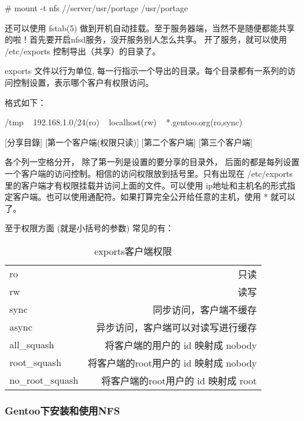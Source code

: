\begin{code}
\# mount -t nfs //server/usr/portage	/usr/portage
\end{code}

还可以使用 fstab(5) 做到开机自动挂载。至于服务器端，当然不是随便都能共享的啦！首先要开启nfsd服务，没开服务别人怎么共享。
开了服务，就可以使用 /etc/exports 控制导出（共享）的目录了。

exports 文件以行为单位, 每一行指示一个导出的目录。每个目录都有一系列的访问控制设置，表示哪个客户有权限访问。

格式如下：

\begin{code}

/tmp  ~      192.168.1.0/24(ro)  ~  localhost(rw)  ~  *.gentoo.org(ro,sync)

[分享目錄]   [第一个客户端(权限只读)]     [第二个客户端]    [第三个客户端]

\end{code}

各个列一空格分开， 除了第一列是设置的要分享的目录外， 后面的都是每列设置一个客户端的访问控制。相信的访问权限放到括号里。只有出现在 /etc/exports 里的客户端才有权限挂载并访问上面的文件。可以使用 ip地址和主机名的形式指定客户端。也可以使用通配符。如果打算完全公开给任意的主机，使用 * 就可以了。

至于权限方面 (就是小括号的参数) 常见的有：

\begin{table}[!h]
\begin{center}
\begin{tabular}{l|r}
\hline
ro & 只读 \\
rw & 读写 \\
sync & 同步访问，客户端不缓存 \\
async & 异步访问，客户端可以对读写进行缓存 \\
all\_squash & 将客户端的用户的 id 映射成 nobody \\
root\_squash & 将客户端的root用户的 id 映射成 nobody \\
no\_root\_squash & 将客户端的root用户的 id 映射成 root \\
\hline
\end{tabular}
\caption{exports客户端权限}
\end{center}
\end{table}
\subsubsection{Gentoo下安装和使用NFS}

